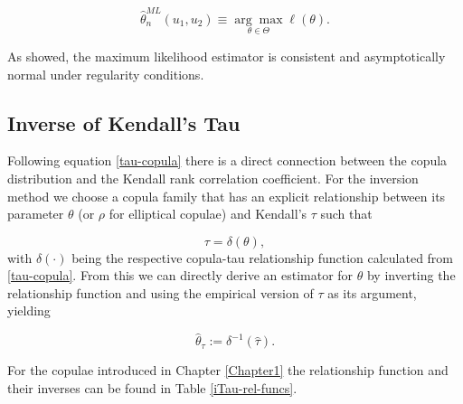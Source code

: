 \begin{equation}
	\label{ml-estimation}
	\hat{\theta}_{n}^{M L}(u_1,u_2) \equiv \underset{\theta \in \Theta}{\arg \max } \ell (\theta).
\end{equation}

As \citet{genest1995semiparametric} showed, the maximum likelihood estimator is consistent and asymptotically normal under regularity conditions.

\subsection{Inverse of Kendall's Tau}

Following equation \ref{tau-copula} there is a direct connection between the copula distribution and the Kendall rank correlation coefficient. For the inversion method we choose a copula family that has an explicit relationship between its parameter $\theta$ (or $\rho$ for elliptical copulae) and Kendall's $\tau$ such that

\begin{equation*}
	\tau = \delta (\theta), 
\end{equation*}
%
with $\delta (\cdot)$ being the respective copula-tau relationship function calculated from \ref{tau-copula}. From this we can directly derive an estimator for $\theta$ by inverting the relationship function and using the empirical version of $\tau$ as its argument, yielding

\begin{equation}
	\hat{\theta}_\tau := \delta^{-1}(\hat{\tau}). 
\end{equation}

For the copulae introduced in Chapter \ref{Chapter1} the relationship function and their inverses can be found in Table \ref{iTau-rel-funcs}.

